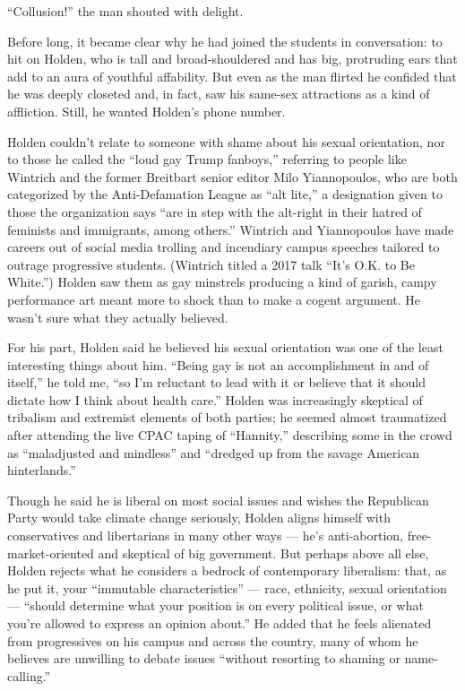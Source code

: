 ``Collusion!'' the man shouted with delight.

Before long, it became clear why he had joined the students in
conversation: to hit on Holden, who is tall and broad-shouldered and has
big, protruding ears that add to an aura of youthful affability. But
even as the man flirted he confided that he was deeply closeted and, in
fact, saw his same-sex attractions as a kind of affliction. Still, he
wanted Holden's phone number.

Holden couldn't relate to someone with shame about his sexual
orientation, nor to those he called the ``loud gay Trump fanboys,''
referring to people like Wintrich and the former Breitbart senior editor
Milo Yiannopoulos, who are both categorized by the Anti-Defamation
League as ``alt lite,'' a designation given to those the organization
says ``are in step with the alt-right in their hatred of feminists and
immigrants, among others.'' Wintrich and Yiannopoulos have made careers
out of social media trolling and incendiary campus speeches tailored to
outrage progressive students. (Wintrich titled a 2017 talk ``It's O.K.
to Be White.'') Holden saw them as gay minstrels producing a kind of
garish, campy performance art meant more to shock than to make a cogent
argument. He wasn't sure what they actually believed.

For his part, Holden said he believed his sexual orientation was one of
the least interesting things about him. ``Being gay is not an
accomplishment in and of itself,'' he told me, ``so I'm reluctant to
lead with it or believe that it should dictate how I think about health
care.'' Holden was increasingly skeptical of tribalism and extremist
elements of both parties; he seemed almost traumatized after attending
the live CPAC taping of ``Hannity,'' describing some in the crowd as
``maladjusted and mindless'' and ``dredged up from the savage American
hinterlands.''

Though he said he is liberal on most social issues and wishes the
Republican Party would take climate change seriously, Holden aligns
himself with conservatives and libertarians in many other ways --- he's
anti-abortion, free-market-oriented and skeptical of big government. But
perhaps above all else, Holden rejects what he considers a bedrock of
contemporary liberalism: that, as he put it, your ``immutable
characteristics'' --- race, ethnicity, sexual orientation --- ``should
determine what your position is on every political issue, or what you're
allowed to express an opinion about.'' He added that he feels alienated
from progressives on his campus and across the country, many of whom he
believes are unwilling to debate issues ``without resorting to shaming
or name-calling.''

